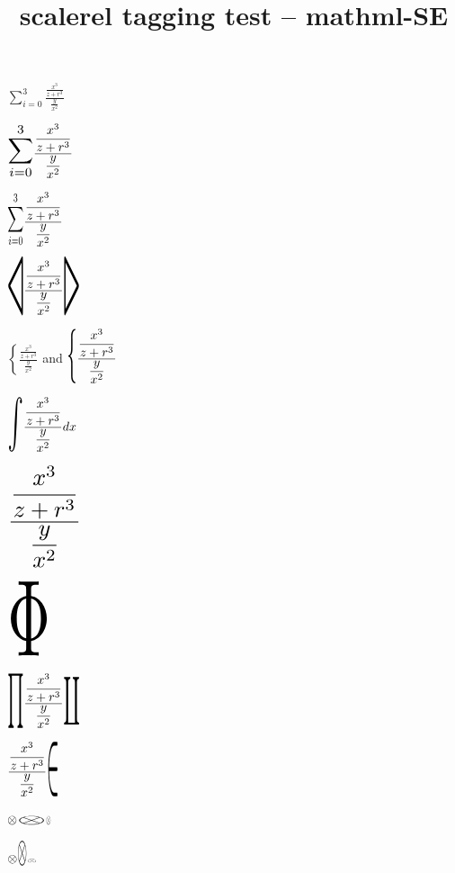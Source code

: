 \documentclass{article}
\title{scalerel tagging test -- mathml-SE}
\def\preblob{\displaystyle\sum_{i=0}^3}
\def\blob{\displaystyle\frac{\displaystyle\frac{x^3}{z+r^3}}%
{\displaystyle\frac{y}{x^2}}%
}
\begin{document}
$\preblob\blob$

$\scalerel{\preblob}{\blob}$

$\scalerel[3ex]{\preblob}{\blob}$

$\scalerel[3ex]{\triangleleft}{\blob}
\scalerel*[3ex]{\triangleright}{\blob}$

$\left\{\blob\right.$ and $\stretchrel[550]{\{}{\blob}$

$\stretchrel[350]{\int}{\blob} dx$

$\scaleto{\blob}{80pt}$

$\stretchto[175]{\Phi}{60pt}$

$\scaleleftright[3ex]{\prod}{\blob}{\coprod}$

$\stretchleftright[450]{.}{\blob}{\in}$

$\otimes\hstretch{3}{\otimes}\hstretch{0.5}{\otimes}$

$\otimes\vstretch{3}{\otimes}\vstretch{0.5}{\otimes}$
\end{document}
